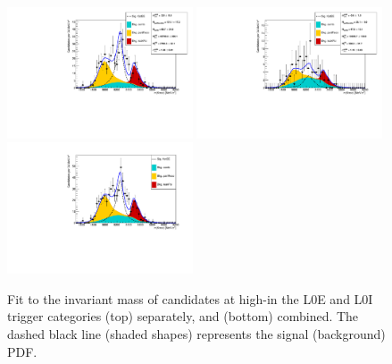 %
\begin{figure}[h!]
\centering
\includegraphics[width=0.49\textwidth]{RKst/figs/Fit/fit_EE/KstEE_high_L0E.pdf}
\includegraphics[width=0.49\textwidth]{RKst/figs/Fit/fit_EE/KstEE_high_L0I.pdf}
\includegraphics[width=0.49\textwidth]{RKst/figs/Fit/fit_EE/fit_EEh.pdf}
\caption{Fit to the \mKpiee invariant mass of \BdToKstee candidates at high-\qsq in the L0E and L0I trigger categories (top) separately, and (bottom) combined. The dashed black line (shaded shapes) represents the signal (background) PDF.}
\label{fig:fitEE_high}
\end{figure}
